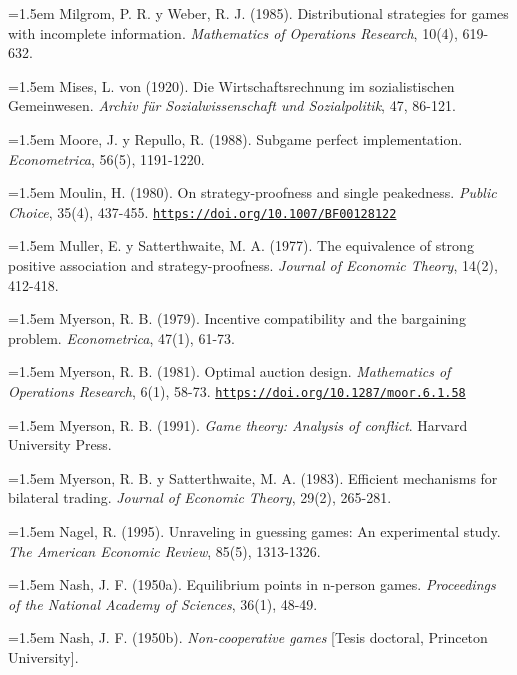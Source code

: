 \documentclass[10pt,a4paper]{article}
\begin{document}
\noindent\hangindent=1.5em Milgrom, P. R. y Weber, R. J. (1985). Distributional strategies for games with incomplete information. \textit{Mathematics of Operations Research}, 10(4), 619-632.

\noindent\hangindent=1.5em Mises, L. von (1920). Die Wirtschaftsrechnung im sozialistischen Gemeinwesen. \textit{Archiv für Sozialwissenschaft und Sozialpolitik}, 47, 86-121.

\noindent\hangindent=1.5em Moore, J. y Repullo, R. (1988). Subgame perfect implementation. \textit{Econometrica}, 56(5), 1191-1220.

\noindent\hangindent=1.5em Moulin, H. (1980). On strategy-proofness and single peakedness. \textit{Public Choice}, 35(4), 437-455. \href{https://doi.org/10.1007/BF00128122}{\nolinkurl{https://doi.org/10.1007/BF00128122}}

\noindent\hangindent=1.5em Muller, E. y Satterthwaite, M. A. (1977). The equivalence of strong positive association and strategy-proofness. \textit{Journal of Economic Theory}, 14(2), 412-418.

\noindent\hangindent=1.5em Myerson, R. B. (1979). Incentive compatibility and the bargaining problem. \textit{Econometrica}, 47(1), 61-73.

\noindent\hangindent=1.5em Myerson, R. B. (1981). Optimal auction design. \textit{Mathematics of Operations Research}, 6(1), 58-73. \href{https://doi.org/10.1287/moor.6.1.58}{\nolinkurl{https://doi.org/10.1287/moor.6.1.58}}

\noindent\hangindent=1.5em Myerson, R. B. (1991). \textit{Game theory: Analysis of conflict}. Harvard University Press.

\noindent\hangindent=1.5em Myerson, R. B. y Satterthwaite, M. A. (1983). Efficient mechanisms for bilateral trading. \textit{Journal of Economic Theory}, 29(2), 265-281.

\noindent\hangindent=1.5em Nagel, R. (1995). Unraveling in guessing games: An experimental study. \textit{The American Economic Review}, 85(5), 1313-1326.

\noindent\hangindent=1.5em Nash, J. F. (1950a). Equilibrium points in n-person games. \textit{Proceedings of the National Academy of Sciences}, 36(1), 48-49.

\noindent\hangindent=1.5em Nash, J. F. (1950b). \textit{Non-cooperative games} [Tesis doctoral, Princeton University].
\end{document}
